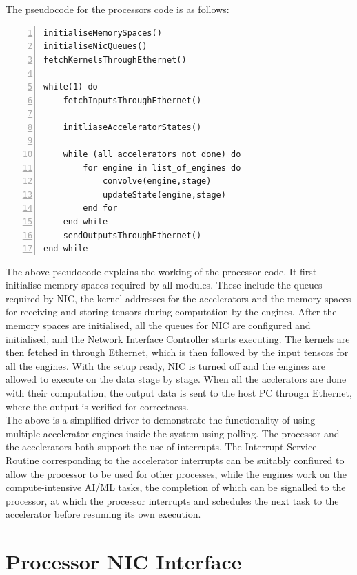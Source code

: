 \documentclass[a4paper,12pt, final]{report}
\begin{document}
The pseudocode for the processors code is as follows:

\begin{Verbatim}[numbers=left]
initialiseMemorySpaces()
initialiseNicQueues()
fetchKernelsThroughEthernet()

while(1) do
	fetchInputsThroughEthernet()
	
	initliaseAcceleratorStates()
	
	while (all accelerators not done) do
		for engine in list_of_engines do
			convolve(engine,stage)
			updateState(engine,stage)
		end for
	end while
	sendOutputsThroughEthernet()
end while
\end{Verbatim}

The above pseudocode explains the working of the processor code. It first initialise memory spaces required by all modules. These include the queues required by NIC, the kernel addresses for the accelerators and the memory spaces for receiving and storing tensors during computation by the engines. After the memory spaces are initialised, all the queues for NIC are configured and initialised, and the Network Interface Controller starts executing. The kernels are then fetched in through Ethernet, which is then followed by the input tensors for all the engines. With the setup ready, NIC is turned off and the engines are allowed to execute on the data stage by stage. When all the acclerators are done with their computation, the output data is sent to the host PC through Ethernet, where the output is verified for correctness.
\\

The above is a simplified driver to demonstrate the functionality of using multiple accelerator engines inside the system using polling. The processor and the  accelerators both support the use of interrupts. The Interrupt Service Routine corresponding to the accelerator interrupts can be suitably confiured to allow the processor to be used for other processes, while the engines work on the compute-intensive AI/ML tasks, the completion of which can be signalled to the processor, at which the processor interrupts and schedules the next task to the accelerator before resuming its own execution.
\\


\section{Processor NIC Interface}
\end{document}

